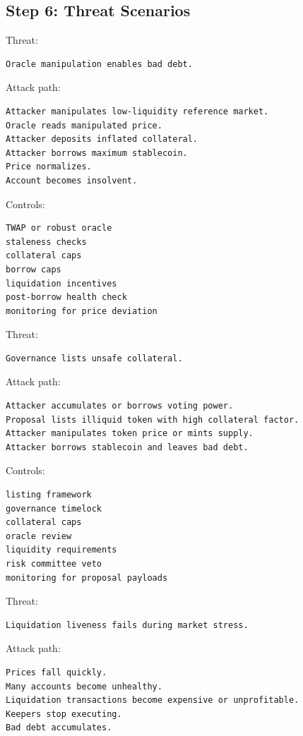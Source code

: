 \subsection{Step 6: Threat Scenarios}

Threat:

\begin{lstlisting}
Oracle manipulation enables bad debt.
\end{lstlisting}

Attack path:

\begin{lstlisting}
Attacker manipulates low-liquidity reference market.
Oracle reads manipulated price.
Attacker deposits inflated collateral.
Attacker borrows maximum stablecoin.
Price normalizes.
Account becomes insolvent.
\end{lstlisting}

Controls:

\begin{lstlisting}
TWAP or robust oracle
staleness checks
collateral caps
borrow caps
liquidation incentives
post-borrow health check
monitoring for price deviation
\end{lstlisting}

Threat:

\begin{lstlisting}
Governance lists unsafe collateral.
\end{lstlisting}

Attack path:

\begin{lstlisting}
Attacker accumulates or borrows voting power.
Proposal lists illiquid token with high collateral factor.
Attacker manipulates token price or mints supply.
Attacker borrows stablecoin and leaves bad debt.
\end{lstlisting}

Controls:

\begin{lstlisting}
listing framework
governance timelock
collateral caps
oracle review
liquidity requirements
risk committee veto
monitoring for proposal payloads
\end{lstlisting}

Threat:

\begin{lstlisting}
Liquidation liveness fails during market stress.
\end{lstlisting}

Attack path:

\begin{lstlisting}
Prices fall quickly.
Many accounts become unhealthy.
Liquidation transactions become expensive or unprofitable.
Keepers stop executing.
Bad debt accumulates.
\end{lstlisting}

